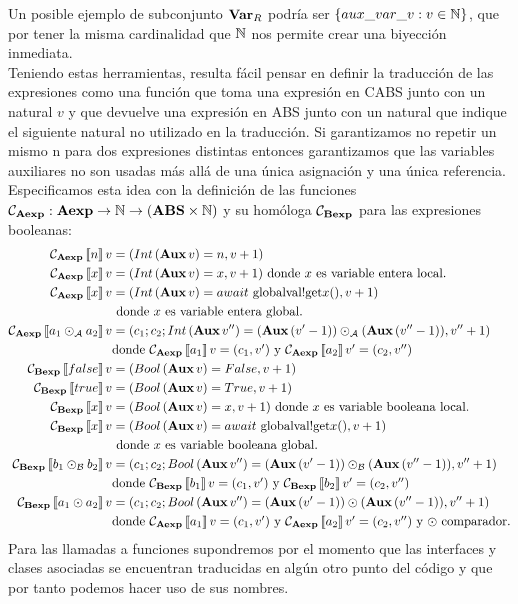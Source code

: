 Un posible ejemplo de subconjunto $\textbf{Var}_R$ podría ser $\{aux\_var\_v: v \in \mathbb{N}\}$, que por tener la misma cardinalidad que $\mathbb{N}$ nos permite crear una biyección inmediata.\\

Teniendo estas herramientas, resulta fácil pensar en definir la traducción de las expresiones como una función que toma una expresión en CABS junto con un natural $v$ y que devuelve una expresión en ABS junto con un natural que indique el siguiente natural no utilizado en la traducción. Si garantizamos no repetir un mismo n para dos expresiones distintas entonces garantizamos que las variables auxiliares no son usadas más allá de una única asignación y una única referencia.\\

Especificamos esta idea con la definición de las funciones $\mathcal{C}_{\textbf{Aexp}}: \textbf{Aexp} \rightarrow \mathbb{N} \rightarrow (\textbf{ABS} \times \mathbb{N})$ y su homóloga  $\mathcal{C}_{\textbf{Bexp}}$ para las expresiones booleanas:
\begin{align*}
  \mathcal{C}_{\textbf{Aexp}}\left\llbracket n \right\rrbracket v &= (Int\, (\textbf{Aux}\, v) = n, v + 1) \\
  \mathcal{C}_{\textbf{Aexp}}\left\llbracket x \right\rrbracket v &= (Int\, (\textbf{Aux}\, v) = x, v + 1) \mbox{ donde $x$ es variable entera local.} \\
  \mathcal{C}_{\textbf{Aexp}}\left\llbracket x \right\rrbracket v &= (Int\, (\textbf{Aux}\, v) = await \mbox{ globalval!get}x(), v + 1) \\
  &\mbox{ donde $x$ es variable entera global.} \\
  \mathcal{C}_{\textbf{Aexp}}\left\llbracket a_1 \odot_{\mathcal{A}} a_2 \right\rrbracket v &= (c_1\mbox{;\,} c_2 \mbox{;\,} Int\, (\textbf{Aux}\, v'') =  (\textbf{Aux}\, (v' - 1))  \odot_{\mathcal{A}}  (\textbf{Aux}\, (v'' - 1)) , v'' + 1) \\
  &\mbox{donde $\mathcal{C}_{\textbf{Aexp}}\left\llbracket a_1 \right\rrbracket v = (c_1, v')$ y $\mathcal{C}_{\textbf{Aexp}}\left\llbracket a_2 \right\rrbracket v' = (c_2, v'')$} \\
  \mathcal{C}_{\textbf{Bexp}}\left\llbracket false \right\rrbracket v &= (Bool\, (\textbf{Aux}\, v) = False, v + 1) \\
  \mathcal{C}_{\textbf{Bexp}}\left\llbracket true \right\rrbracket v &= (Bool\, (\textbf{Aux}\, v) = True, v + 1) \\
  \mathcal{C}_{\textbf{Bexp}}\left\llbracket x \right\rrbracket v &= (Bool\, (\textbf{Aux}\, v) = x, v + 1) \mbox{ donde $x$ es variable booleana local.} \\
  \mathcal{C}_{\textbf{Bexp}}\left\llbracket x \right\rrbracket v &= (Bool\, (\textbf{Aux}\, v) = await \mbox{ globalval!get}x(), v + 1) \\
  &\mbox{ donde $x$ es variable booleana global.} \\
  \mathcal{C}_{\textbf{Bexp}}\left\llbracket b_1 \odot_{\mathcal{B}} b_2 \right\rrbracket v &= (c_1\mbox{;\,} c_2 \mbox{;\,} Bool\, (\textbf{Aux}\, v'') =  (\textbf{Aux}\, (v' - 1))  \odot_{\mathcal{B}}  (\textbf{Aux}\, (v'' - 1)) , v'' + 1) \\
  &\mbox{donde $\mathcal{C}_{\textbf{Bexp}}\left\llbracket b_1 \right\rrbracket v = (c_1, v')$ y $\mathcal{C}_{\textbf{Bexp}}\left\llbracket b_2 \right\rrbracket v' = (c_2, v'')$} \\
  \mathcal{C}_{\textbf{Bexp}}\left\llbracket a_1 \odot a_2 \right\rrbracket v &= (c_1\mbox{;\,} c_2 \mbox{;\,} Bool\, (\textbf{Aux}\, v'') =  (\textbf{Aux}\, (v' - 1))  \odot  (\textbf{Aux}\, (v'' - 1)) , v'' + 1) \\
  &\mbox{donde $\mathcal{C}_{\textbf{Aexp}}\left\llbracket a_1 \right\rrbracket v = (c_1, v')$ y $\mathcal{C}_{\textbf{Aexp}}\left\llbracket a_2 \right\rrbracket v' = (c_2, v'')$ y $\odot$ comparador.}
\end{align*}
Para las llamadas a funciones supondremos por el momento que las interfaces y clases asociadas se encuentran traducidas en algún otro punto del código y que por tanto podemos hacer uso de sus nombres.

